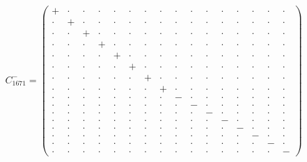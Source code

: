 \documentclass[
  10pt,
]{article}
\begin{document}
\[C^-_{1671}=\left(\begin{smallmatrix} + & \cdot & \cdot & \cdot & \cdot & \cdot & \cdot & \cdot & \cdot & \cdot & \cdot & \cdot & \cdot & \cdot & \cdot & \cdot \\ \cdot & + & \cdot & \cdot & \cdot & \cdot & \cdot & \cdot & \cdot & \cdot & \cdot & \cdot & \cdot & \cdot & \cdot & \cdot \\ \cdot & \cdot & + & \cdot & \cdot & \cdot & \cdot & \cdot & \cdot & \cdot & \cdot & \cdot & \cdot & \cdot & \cdot & \cdot \\ \cdot & \cdot & \cdot & + & \cdot & \cdot & \cdot & \cdot & \cdot & \cdot & \cdot & \cdot & \cdot & \cdot & \cdot & \cdot \\ \cdot & \cdot & \cdot & \cdot & + & \cdot & \cdot & \cdot & \cdot & \cdot & \cdot & \cdot & \cdot & \cdot & \cdot & \cdot \\ \cdot & \cdot & \cdot & \cdot & \cdot & + & \cdot & \cdot & \cdot & \cdot & \cdot & \cdot & \cdot & \cdot & \cdot & \cdot \\ \cdot & \cdot & \cdot & \cdot & \cdot & \cdot & + & \cdot & \cdot & \cdot & \cdot & \cdot & \cdot & \cdot & \cdot & \cdot \\ \cdot & \cdot & \cdot & \cdot & \cdot & \cdot & \cdot & + & \cdot & \cdot & \cdot & \cdot & \cdot & \cdot & \cdot & \cdot \\ \cdot & \cdot & \cdot & \cdot & \cdot & \cdot & \cdot & \cdot & - & \cdot & \cdot & \cdot & \cdot & \cdot & \cdot & \cdot \\ \cdot & \cdot & \cdot & \cdot & \cdot & \cdot & \cdot & \cdot & \cdot & - & \cdot & \cdot & \cdot & \cdot & \cdot & \cdot \\ \cdot & \cdot & \cdot & \cdot & \cdot & \cdot & \cdot & \cdot & \cdot & \cdot & - & \cdot & \cdot & \cdot & \cdot & \cdot \\ \cdot & \cdot & \cdot & \cdot & \cdot & \cdot & \cdot & \cdot & \cdot & \cdot & \cdot & - & \cdot & \cdot & \cdot & \cdot \\ \cdot & \cdot & \cdot & \cdot & \cdot & \cdot & \cdot & \cdot & \cdot & \cdot & \cdot & \cdot & - & \cdot & \cdot & \cdot \\ \cdot & \cdot & \cdot & \cdot & \cdot & \cdot & \cdot & \cdot & \cdot & \cdot & \cdot & \cdot & \cdot & - & \cdot & \cdot \\ \cdot & \cdot & \cdot & \cdot & \cdot & \cdot & \cdot & \cdot & \cdot & \cdot & \cdot & \cdot & \cdot & \cdot & - & \cdot \\ \cdot & \cdot & \cdot & \cdot & \cdot & \cdot & \cdot & \cdot & \cdot & \cdot & \cdot & \cdot & \cdot & \cdot & \cdot & - \end{smallmatrix}\right)\]
\end{document}
